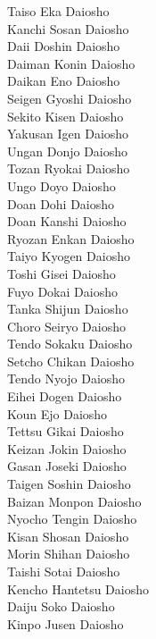 \documentclass[12pt]{report}
\begin{document}
\begin{multicols*}{3}
  Taiso Eka Daiosho          \\ 
  Kanchi Sosan Daiosho       \\ 
  Daii Doshin Daiosho        \\ 
  Daiman Konin Daiosho       \\ 
  Daikan Eno Daiosho         \\ 
  Seigen Gyoshi Daiosho      \\ 
  Sekito Kisen Daiosho       \\ 
  Yakusan Igen Daiosho       \\ 
  Ungan Donjo Daiosho        \\ 
  Tozan Ryokai Daiosho       \\ 
  Ungo Doyo Daiosho          \\ 
  Doan Dohi Daiosho          \\ 
  Doan Kanshi Daiosho        \\ 
  Ryozan Enkan Daiosho       \\ 
  Taiyo Kyogen Daiosho       \\ 
  Toshi Gisei Daiosho        \\ 
  Fuyo Dokai Daiosho         \\ 
  Tanka Shijun Daiosho       \\ 
  Choro Seiryo Daiosho       \\ 
  Tendo Sokaku Daiosho       \\ 
  Setcho Chikan Daiosho      \\ 
  Tendo Nyojo Daiosho        \\ 
  Eihei Dogen Daiosho        \columnbreak \\
  Koun Ejo Daiosho           \\
  Tettsu Gikai Daiosho       \\ 
  Keizan Jokin Daiosho       \\ 
  Gasan Joseki Daiosho       \\ 
  Taigen Soshin Daiosho      \\ 
  Baizan Monpon Daiosho      \\ 
  Nyocho Tengin Daiosho      \\ 
  Kisan Shosan Daiosho       \\ 
  Morin Shihan Daiosho       \\ 
  Taishi Sotai Daiosho       \\ 
  Kencho Hantetsu Daiosho    \\ 
  Daiju Soko Daiosho         \\ 
  Kinpo Jusen Daiosho        \\ 

\end{multicols*}
\end{document}
